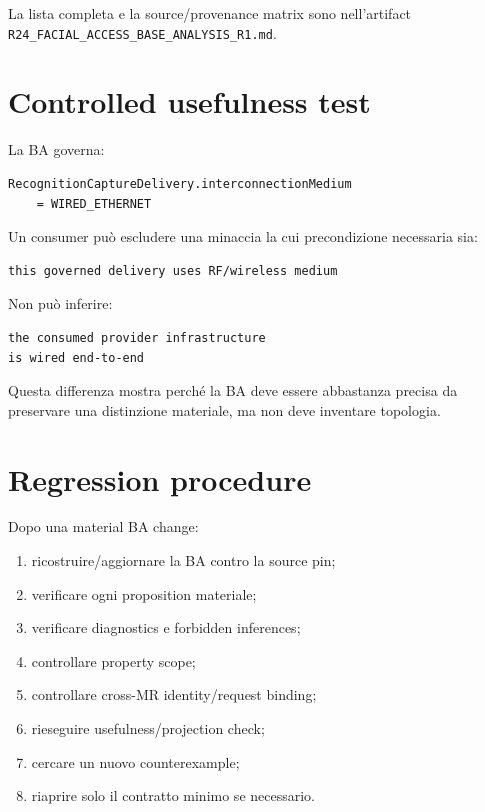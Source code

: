 \documentclass[11pt,a4paper]{article}
\newcommand{\code}[1]{\nolinkurl{#1}}
\begin{document}
La lista completa e la source/provenance matrix sono nell'artifact \code{R24_FACIAL_ACCESS_BASE_ANALYSIS_R1.md}.

\section{Controlled usefulness test}

La BA governa:

\begin{lstlisting}
RecognitionCaptureDelivery.interconnectionMedium
    = WIRED_ETHERNET
\end{lstlisting}

Un consumer può escludere una minaccia la cui precondizione necessaria sia:

\begin{lstlisting}
this governed delivery uses RF/wireless medium
\end{lstlisting}

Non può inferire:

\begin{lstlisting}
the consumed provider infrastructure
is wired end-to-end
\end{lstlisting}

Questa differenza mostra perché la BA deve essere abbastanza precisa da preservare una distinzione materiale, ma non deve inventare topologia.

\section{Regression procedure}

Dopo una material BA change:

\begin{enumerate}
\item ricostruire/aggiornare la BA contro la source pin;
\item verificare ogni proposition materiale;
\item verificare diagnostics e forbidden inferences;
\item controllare property scope;
\item controllare cross-MR identity/request binding;
\item rieseguire usefulness/projection check;
\item cercare un nuovo counterexample;
\item riaprire solo il contratto minimo se necessario.
\end{enumerate}
\end{document}
